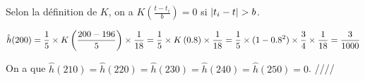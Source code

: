 \documentclass[../main.tex]{subfiles}
\begin{document}
\begin{CJK*}{UTF8}{gbsn}
Selon la définition de $K$, on a $K(\frac{t-t_{i}}{b}) = 0$ si $\abs{t_i-t}>b$.

\begin{equation*}
    \hat{h}(200) = \frac{1}{5} \times K\left ( \frac{200-196}{5} \right ) \times \frac{1}{18}
                 = \frac{1}{5} \times K\left ( 0.8 \right ) \times \frac{1}{18}
                 = \frac{1}{5} \times (1-0.8^2) \times \frac{3}{4} \times \frac{1}{18}
                 = \frac{3}{1000}
\end{equation*}

On a que $\hat{h}(210) = \hat{h}(220) = \hat{h}(230) = \hat{h}(240) =  \hat{h}(250) = 0$. ////

\end{CJK*}
\end{document}
